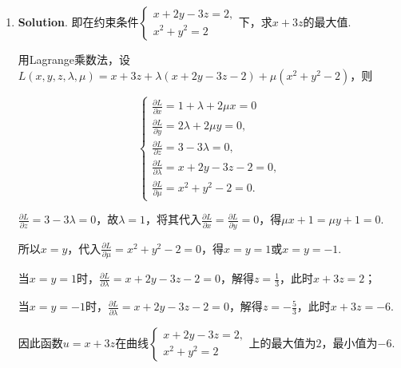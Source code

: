 \documentclass[../Main.tex]{subfiles}
\begin{document}
\begin{enumerate}
    \item \textbf{Solution}. 即在约束条件$\begin{cases}
                  x+2y-3z = 2, \\
                  x^{2}+y^{2} = 2
              \end{cases}$下，求$x+3z$的最大值.

          用Lagrange乘数法，设$L(x,y,z,\lambda,\mu) = x+3z + \lambda\left(x+2y-3z-2\right
              ) + \mu\left(x^{2}+y^{2}-2\right)$，则

          \[
              \begin{cases}
                  \frac{\partial L}{\partial x}= 1+\lambda + 2\mu x = 0 \\[6pt]
                  \frac{\partial L}{\partial y}= 2\lambda + 2\mu y = 0, \\[6pt]
                  \frac{\partial L}{\partial z}= 3 - 3\lambda = 0,      \\[6pt]
                  \frac{\partial L}{\partial \lambda}= x+2y-3z-2 = 0,   \\[6pt]
                  \frac{\partial L}{\partial \mu}= x^{2}+y^{2}-2 = 0.
              \end{cases}
          \]

          $\frac{\partial L}{\partial z}= 3 - 3\lambda = 0$，故$\lambda = 1$，将其代入$\frac{\partial
                  L}{\partial x}= \frac{\partial L}{\partial y}= 0$，得$\mu x + 1 =\mu y + 1 =
              0$.

          所以$x=y$，代入$\frac{\partial L}{\partial \mu}= x^{2}+y^{2}-2 = 0$，得$x=y
              =1$或$x=y=-1$.

          当$x=y=1$时，$\frac{\partial L}{\partial \lambda}= x+2y-3z-2 = 0$，解得$z=\frac{1}{3}$，此时$x
              +3z = 2$；

          当$x=y=-1$时，$\frac{\partial L}{\partial \lambda}= x+2y-3z-2 = 0$，解得$z=
              -\frac{5}{3}$，此时$x+3z = -6$.

          因此函数$u=x+3z$在曲线$\begin{cases}
                  x+2y-3z=2, \\
                  x^{2}+y^{2} = 2
              \end{cases}$上的最大值为$2$，最小值为$-6$.


\end{enumerate}
\end{document}
